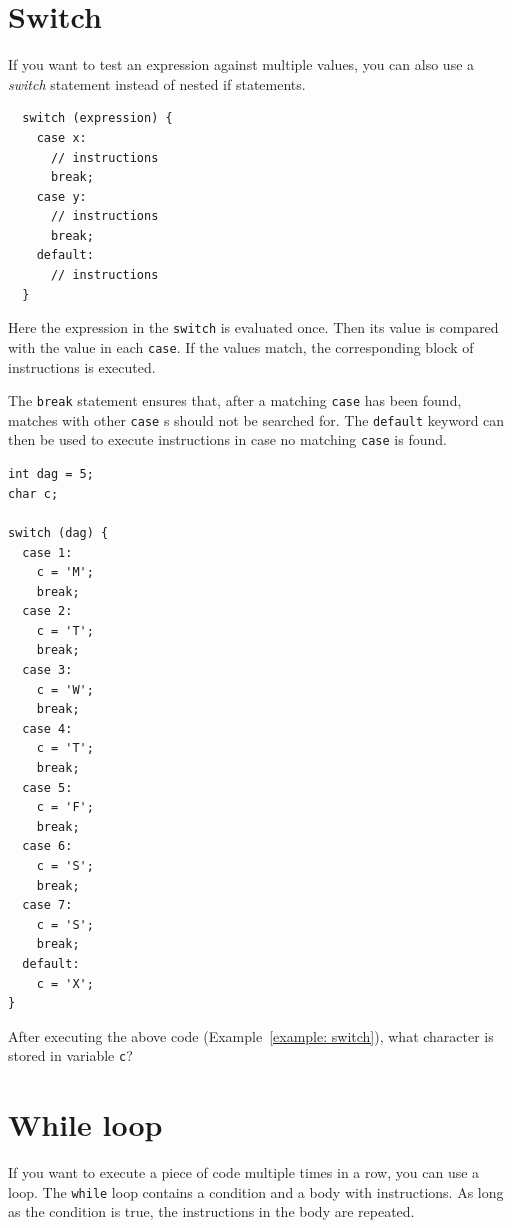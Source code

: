 \documentclass[11pt,fleqn]{book} %
\begin{document}
\section{Switch}
If you want to test an expression against multiple values, you can also use a \emph{switch} statement instead of nested if statements.

\begin{definition}[Switch]
	\phantom{ }
	\begin{verbatim}
  switch (expression) {
    case x:
      // instructions
      break;
    case y:
      // instructions
      break;
    default:
      // instructions
  }
	\end{verbatim}
\end{definition}

\noindent
Here the expression in the \texttt{switch} is evaluated once. Then its value is compared with the value in each \texttt{case}. If the values match, the corresponding block of instructions is executed.

The \texttt{break} statement ensures that, after a matching \texttt{case} has been found, matches with other \texttt{case} s should not be searched for. The \texttt{default} keyword can then be used to execute instructions in case no matching \texttt{case} is found.

\begin{example}
	\label{example:switch}
	\phantom{ }
	\begin{verbatim}
int dag = 5;
char c;

switch (dag) {
  case 1:
    c = 'M';
    break;
  case 2:
    c = 'T';
    break;
  case 3:
    c = 'W';
    break;
  case 4:
    c = 'T';
    break;
  case 5:
    c = 'F';
    break;
  case 6:
    c = 'S';
    break;
  case 7:
    c = 'S';
    break;
  default:
    c = 'X';
}
	\end{verbatim}
\end{example}

\begin{exercise}
    After executing the above code (Example~\ref{example: switch}), what character is stored in variable \texttt{c}?
\end{exercise}

\section{While loop}
If you want to execute a piece of code multiple times in a row, you can use a loop. The \texttt{while} loop contains a condition and a body with instructions. As long as the condition is true, the instructions in the body are repeated.
\end{document}
